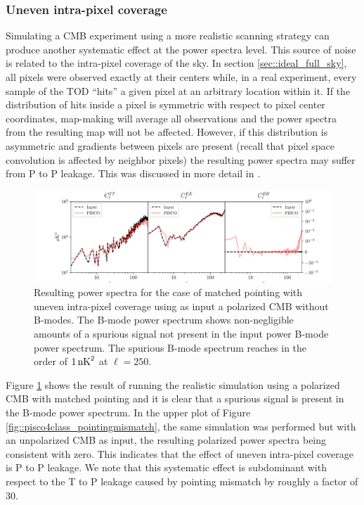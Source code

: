 \documentclass[a4paper,11pt]{article}
\begin{document}
\subsubsection{Uneven intra-pixel coverage}

Simulating a CMB experiment using a more realistic scanning strategy can produce another systematic effect at the power spectra level. This source of noise is related to the intra-pixel coverage of the sky. In section \ref{sec::ideal_full_sky}, all pixels were observed exactly at their centers while, in a real experiment, every sample of the TOD ``hits'' a given pixel at an arbitrary location within it. If the distribution of hits inside a pixel is symmetric with respect to pixel center coordinates, map-making will average all observations and the power spectra from the resulting map will not be affected. However, if this distribution is asymmetric and gradients between pixels are present (recall that pixel space convolution is affected by neighbor pixels) the resulting power spectra may suffer from P to P leakage. This was discussed in more detail in \cite{2005poutanen}. 

\begin{figure}
	\centering
	\includegraphics[width=1\textwidth]{figures/cmb_r0d00_CLASS_matchedPointing_matchedBeams_ellipticalBeams.pdf}
	\caption{Resulting power spectra for the case of matched pointing with uneven intra-pixel coverage using as input a polarized CMB without B-modes. The B-mode power spectrum shows non-negligible amounts of a spurious signal not present in the input power B-mode power spectrum. The spurious B-mode spectrum reaches in the order of $1\, \rm{nK}^2$ at $\ell = 250$.}
	\label{fig::pisco4class_intrapixel}
\end{figure}

Figure \ref{fig::pisco4class_intrapixel} shows the result of running the realistic simulation using a polarized CMB with matched pointing and it is clear that a spurious signal is present in the B-mode power spectrum. In the upper plot of Figure \ref{fig::pisco4class_pointingmismatch}, the same simulation was performed but with an unpolarized CMB as input, the resulting polarized power spectra being consistent with zero. This indicates that the effect of uneven intra-pixel coverage is P to P leakage. We note that this systematic effect is subdominant with respect to the T to P leakage caused by pointing mismatch by roughly a factor of $30$.
\end{document}

